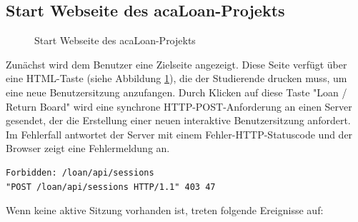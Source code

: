 \subsection{Start Webseite des acaLoan-Projekts}
\label{sec:display_client:start}
\begin{figure}[h!]
	\centering
	\caption{Start Webseite des acaLoan-Projekts}
	\label{fig:start_page}
\end{figure}
Zunächst wird dem Benutzer eine Zielseite angezeigt. Diese Seite verfügt über eine HTML-Taste (siehe Abbildung \ref{fig:start_page}), die der Studierende drucken muss, um eine neue Benutzersitzung anzufangen. Durch Klicken auf diese Taste "Loan / Return Board" wird eine synchrone HTTP-POST-Anforderung an einen Server gesendet, der die Erstellung einer neuen interaktive Benutzersitzung anfordert. Im Fehlerfall antwortet der Server mit einem Fehler-HTTP-Statuscode und der Browser zeigt eine Fehlermeldung an.
\begin{lstlisting}[caption={[Fehler-HTTP-Statuscode] },captionpos=b]
Forbidden: /loan/api/sessions
"POST /loan/api/sessions HTTP/1.1" 403 47
\end{lstlisting}
Wenn keine aktive Sitzung vorhanden ist, treten folgende Ereignisse auf:
